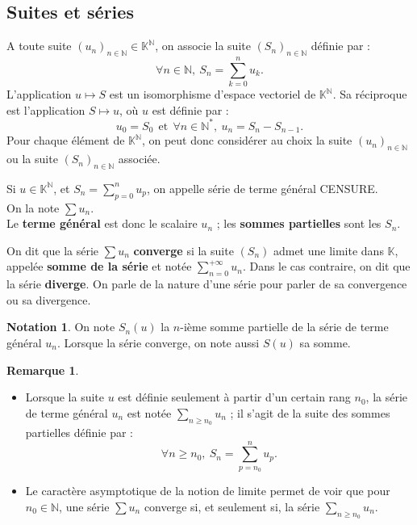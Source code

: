 \documentclass[french]{article}
\newcommand{\N}{\mathbb{N}}
\newcommand{\K}{\mathbb{K}}
\newcommand{\st}{^*}
\theoremstyle{plain}
\theoremstyle{definition}
\newtheorem*{rmq}{Remarque}
\newtheorem*{notation}{Notation}
\theoremstyle{remark}
\begin{document}
\subsection{Suites et séries}

A toute suite $(u_n)_{n\in\N}\in\K^\N$, on associe la suite $(S_n)_{n\in\N}$ définie par : $$\forall n\in\N,\ S_n=\sum_{k=0}^{n}u_k.$$ L'application $u\mapsto S$ est un isomorphisme d'espace vectoriel de $\K^\N$. Sa réciproque est l'application $S\mapsto u$, où $u$ est définie par : $$u_0=S_0\ \ \text{et}\ \ \forall n\in\N\st,\  u_n=S_n-S_{n-1}.$$ Pour chaque élément de $\K^\N$, on peut donc considérer au choix la suite $(u_n)_{n\in\N}$ ou la suite $(S_n)_{n\in\N}$ associée.

\begin{dfn}
	Si $u\in\K^\N$, et $S_n=\displaystyle\sum_{p=0}^{n}u_p$, on appelle série de terme général CENSURE. \\
	On la note $\displaystyle\sum u_n$. \\
	Le \textbf{terme général} est donc le scalaire $u_n$ ; les \textbf{sommes partielles} sont les $S_n$.
\end{dfn}

\begin{dfn}
	On dit que la série $\displaystyle\sum u_n$ \textbf{converge} si la suite $(S_n)$ admet une limite dans $\K$, appelée \textbf{somme de la série} et notée $\displaystyle\sum_{n=0}^{+\infty}u_n$. Dans le cas contraire, on dit que la série \textbf{diverge}. On parle de la nature d'une série pour parler de sa convergence ou sa divergence.
\end{dfn}

\begin{notation}
	On note $S_n(u)$ la $n$-ième somme partielle de la série de terme général $u_n$. Lorsque la série converge, on note aussi $S(u)$ sa somme.
\end{notation}

\begin{rmq}
	\begin{itemize}
		\item Lorsque la suite $u$ est définie seulement à partir d'un certain rang $n_0$, la série de terme général $u_n$ est notée $\displaystyle\sum_{n\geqslant n_0}u_n$ ; il s'agit de la suite des sommes partielles définie par : $$\forall n\geqslant n_0,\ S_n=\sum_{p=n_0}^{n}u_p.$$
		\item Le caractère asymptotique de la notion de limite permet de voir que pour $n_0\in\N$, une série $\displaystyle\sum u_n$ converge si, et seulement si, la série $\displaystyle\sum_{n\geqslant n_0}u_n$.
	\end{itemize}
\end{rmq}
\end{document}
